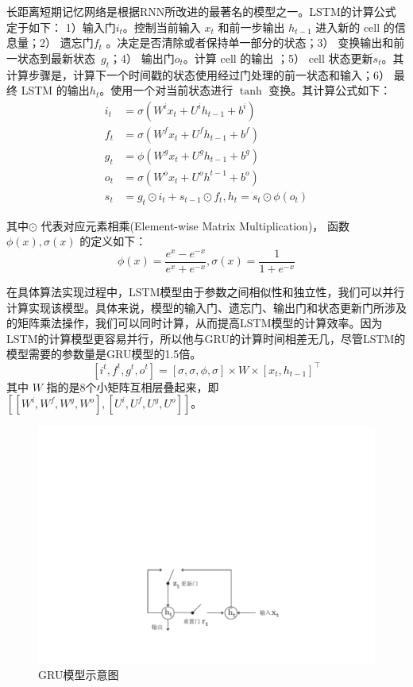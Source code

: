 长距离短期记忆网络是根据RNN所改进的最著名的模型之一。LSTM的计算公式定于如下： 1）输入门$i_t$。控制当前输入 $x_t$ 和前一步输出 $h_{t−1}$ 进入新的 cell 的信息量；2） 遗忘门$f_t$ 。决定是否清除或者保持单一部分的状态；3） 变换输出和前一状态到最新状态~$g_t$；4） 输出门$o_t$。计算 cell 的输出 ；5） cell 状态更新$s_t$。其计算步骤是，计算下一个时间戳的状态使用经过门处理的前一状态和输入；6） 最终 LSTM 的输出$h_t$。使用一个对当前状态进行 $\tanh$ 变换。其计算公式如下：
\begin{equation}\label{equ:lstm}
\begin{split}
   i_t&=\sigma(W^i x_t+U^i h_{t-1}+b^i) \\
   f_t&=\sigma(W^f x_t+U^f h_{t-1}+b^f) \\
   g_t&=\phi(W^g x_t+U^g h_{t-1}+b^g) \\
   o_t&=\sigma(W^o x_t+U^o h^{t-1}+b^o) \\
   s_t&=g_t\odot i_t+s_{t-1}\odot f_t, h_t=s_t\odot \phi(o_t)
\end{split}
\end{equation}

\noindent 其中$\odot$ 代表对应元素相乘(Element-wise Matrix Multiplication)， 函数 $\phi(x), \sigma(x)$ 的定义如下：
\begin{equation}\label{equ:tanh}
  \phi(x)=\frac{e^x-e^{-x}}{e^x+e^{-x}},\sigma(x)=\frac{1}{1+e^{-x}}
\end{equation}

在具体算法实现过程中，LSTM模型由于参数之间相似性和独立性，我们可以并行计算实现该模型。具体来说，模型的输入门、遗忘门、输出门和状态更新门所涉及的矩阵乘法操作，我们可以同时计算，从而提高LSTM模型的计算效率。因为LSTM的计算模型更容易并行，所以他与GRU的计算时间相差无几，尽管LSTM的模型需要的参数量是GRU模型的1.5倍。
\begin{equation}\label{equ:lstm}
[i^t,f^t,g^t,o^t ]=[\sigma, \sigma,\phi,\sigma]\times W\times[x_t,h_{t-1}]^\top
\end{equation}
其中 $W$ 指的是8个小矩阵互相层叠起来，即 $[[W^i,W^f,W^g,W^o],[U^i,U^f,U^g,U^o]]$。


\begin{figure}[!t]
  \centering
  \includegraphics[width=0.6\linewidth]{./figures/gru.pdf}
  \caption{GRU模型示意图}\label{fig:gru}
\end{figure}

